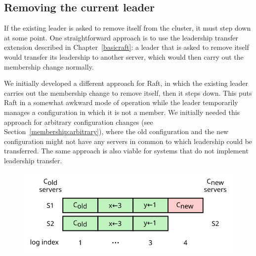 \subsection{Removing the current leader}
\label{membership:availability:removing}


If the existing leader is asked to remove itself from the cluster, it
must step down at some point. One straightforward approach is to use
the leadership transfer extension described in Chapter~\ref{basicraft}:
a leader that is asked to remove itself would transfer its leadership to
another server, which would then carry out the membership change normally.

We initially developed a different approach for Raft, in which the
existing leader carries out the membership change to remove itself, then
it steps down. This puts Raft in a somewhat awkward mode of operation
while the leader temporarily manages a configuration in which it is not
a member. We initially needed this approach for arbitrary configuration
changes (see Section~\ref{membership:arbitrary}), where the old
configuration and the new configuration might not have any servers in
common to which leadership could be transferred. The same approach is
also viable for systems that do not implement leadership transfer.

\begin{figure}
\centering
\includegraphics[scale=1]{membership/removedlog3}
\label{fig:membership:removedlog3}
\end{figure}

